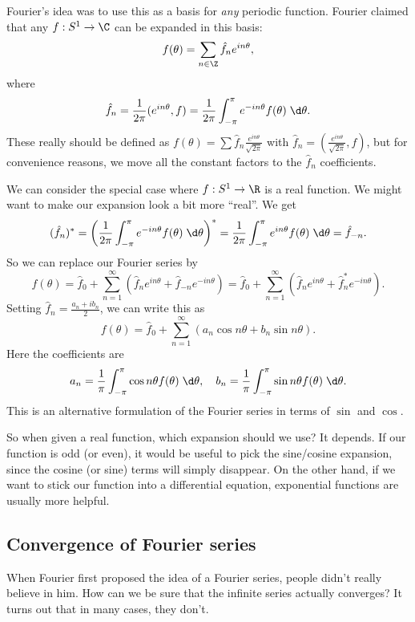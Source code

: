 \documentclass[a4paper]{article}
\begin{document}
Fourier's idea was to use this as a basis for \emph{any} periodic function. Fourier claimed that any $f: S^1 \to \C$ can be expanded in this basis:
\[
  f(\theta) = \sum_{n \in \Z}\hat{f}_n e^{in\theta},
\]
where
\[
  \hat{f}_n = \frac{1}{2\pi} (e^{in\theta}, f) = \frac{1}{2\pi}\int_{-\pi}^\pi e^{-in\theta} f(\theta)\;\d \theta.
\]
These really should be defined as $f(\theta) = \sum \hat{f}_n \frac{e^{in\theta}}{\sqrt{2\pi}}$ with $\hat{f}_n = \left(\frac{e^{in\theta}}{\sqrt{2\pi}}, f\right)$, but for convenience reasons, we move all the constant factors to the $\hat{f}_n$ coefficients.

We can consider the special case where $f: S^1 \to \R$ is a real function. We might want to make our expansion look a bit more ``real''. We get
\[
  (\hat{f}_n)^* = \left(\frac{1}{2\pi}\int_{-\pi}^\pi e^{-in\theta}f(\theta)\;\d \theta\right)^* = \frac{1}{2\pi}\int_{-\pi}^{\pi}e^{in\theta}f(\theta)\;\d \theta = \hat{f}_{-n}.
\]
So we can replace our Fourier series by
\[
  f(\theta) = \hat{f}_0 + \sum_{n = 1}^\infty\left(\hat{f}_n e^{in\theta} + \hat{f}_{-n}e^{-in\theta}\right) = \hat{f}_0 + \sum_{n = 1}^\infty \left(\hat{f}_n e^{in\theta} + \hat{f}_n^* e^{-in\theta}\right).
\]
Setting $\displaystyle \hat{f}_n = \frac{a_n + ib_n}{2}$, we can write this as
\[
  f(\theta) = \hat{f}_0 + \sum_{n = 1}^\infty (a_n \cos n\theta + b_n \sin n\theta).
\]
Here the coefficients are
\[
  a_n = \frac{1}{\pi}\int_{-\pi}^\pi \cos n\theta f(\theta) \;\d \theta,\quad b_n = \frac{1}{\pi}\int_{-\pi}^\pi \sin n\theta f(\theta) \;\d \theta.
\]
This is an alternative formulation of the Fourier series in terms of $\sin$ and $\cos$.

So when given a real function, which expansion should we use? It depends. If our function is odd (or even), it would be useful to pick the sine/cosine expansion, since the cosine (or sine) terms will simply disappear. On the other hand, if we want to stick our function into a differential equation, exponential functions are usually more helpful.

\subsection{Convergence of Fourier series}
When Fourier first proposed the idea of a Fourier series, people didn't really believe in him. How can we be sure that the infinite series actually converges? It turns out that in many cases, they don't.
\end{document}
